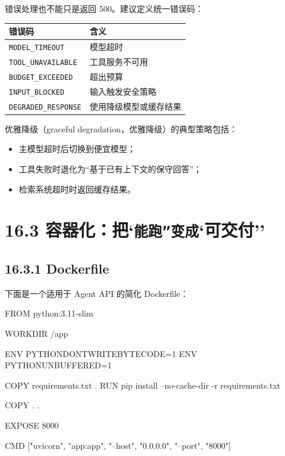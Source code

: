 错误处理也不能只是返回 500。建议定义统一错误码：


\begingroup
\scriptsize
\setlength{\tabcolsep}{3pt}
\begin{longtable}{|p{}|p{}|}
\hline
错误码 & 含义 \\ \hline
\texttt{MODEL\_TIMEOUT} & 模型超时 \\ \hline
\texttt{TOOL\_UNAVAILABLE} & 工具服务不可用 \\ \hline
\texttt{BUDGET\_EXCEEDED} & 超出预算 \\ \hline
\texttt{INPUT\_BLOCKED} & 输入触发安全策略 \\ \hline
\texttt{DEGRADED\_RESPONSE} & 使用降级模型或缓存结果 \\ \hline
\end{longtable}
\endgroup

优雅降级（graceful degradation，优雅降级）的典型策略包括：


\begin{itemize}[leftmargin=2em]
\item 主模型超时后切换到便宜模型；
\item 工具失败时退化为``基于已有上下文的保守回答''；
\item 检索系统超时时返回缓存结果。
\end{itemize}

\section{16.3 容器化：把`\texttt{能跑''变成}`可交付''}

\subsection{16.3.1 Dockerfile}

下面是一个适用于 Agent API 的简化 Dockerfile：


\begin{codeblock}
FROM python:3.11-slim

WORKDIR /app

ENV PYTHONDONTWRITEBYTECODE=1
ENV PYTHONUNBUFFERED=1

COPY requirements.txt .
RUN pip install --no-cache-dir -r requirements.txt

COPY . .

EXPOSE 8000

CMD ["uvicorn", "app:app", "--host", "0.0.0.0", "--port", "8000"]
\end{codeblock}


